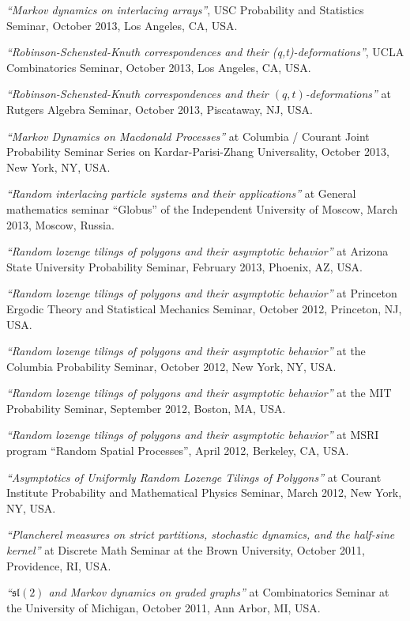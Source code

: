 \documentclass[letterpaper,11pt]{article}
\begin{document}
\begin{etaremune}
  \item 
  \emph{``Markov dynamics on interlacing arrays''},
  USC Probability and Statistics Seminar, 
  October 2013,
  Los Angeles, CA, USA.
  \item \emph{``Robinson-Schensted-Knuth correspondences and their (q,t)-deformations''},
  UCLA Combinatorics Seminar,
  October 2013,
  Los Angeles, CA, USA.
  \item \emph{``Robinson-Schensted-Knuth correspondences and their $(q,t)$-deformations''}
  at Rutgers Algebra Seminar, October 2013, 
  Piscataway, NJ, USA.
  \item \emph{``Markov Dynamics on Macdonald Processes''}
  at Columbia / Courant Joint Probability Seminar Series on Kardar-Parisi-Zhang Universality,
  October 2013, New York, NY, USA.
  \item 
  \emph{``Random interlacing particle systems and their applications''} at 
  General mathematics seminar ``Globus''
  of the Independent University of Moscow,
  March 2013, Moscow, Russia.
  \item \emph{``Random lozenge tilings of polygons and their asymptotic behavior''} at 
  Arizona State University
  Probability Seminar, February 2013, Phoenix, AZ, USA.
  \item \emph{``Random lozenge tilings of polygons and their asymptotic behavior''} at Princeton 
  Ergodic Theory and Statistical Mechanics Seminar, October 2012, Princeton, NJ, USA.
  \item \emph{``Random lozenge tilings of polygons and their asymptotic behavior''} at the Columbia Probability Seminar, October 2012, New York, NY, USA.
  \item \emph{``Random lozenge tilings of polygons and their asymptotic behavior''} at the MIT Probability Seminar, September 2012, Boston, MA, USA.
  \item \emph{``Random lozenge tilings of polygons and their asymptotic behavior''} at MSRI program ``Random Spatial Processes'', April 2012, Berkeley, CA, USA.
  \item \emph{``Asymptotics of Uniformly Random Lozenge Tilings of Polygons''} at
  Courant Institute Probability and Mathematical Physics Seminar, March 2012, New York, NY, USA.
  \item \emph{``Plancherel measures on strict partitions, stochastic dynamics, and the half-sine kernel''} at Discrete Math Seminar at the Brown University, October 2011, Providence, RI, USA.
  \item 
  \emph{``$\mathfrak{sl}(2)$ and Markov dynamics on graded graphs''} at
  Combinatorics Seminar at the University of Michigan, October 2011, Ann Arbor, MI, USA.
\end{etaremune}
\end{document}
